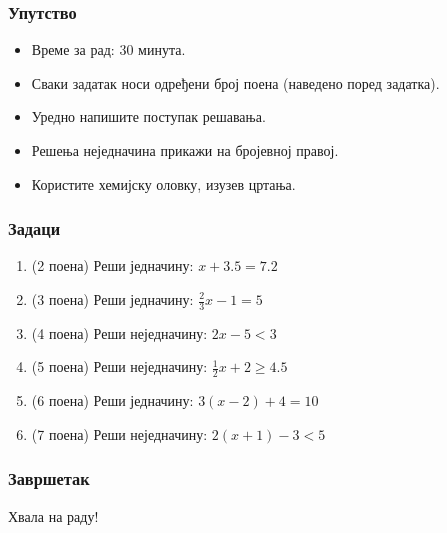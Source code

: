 \documentclass[11pt]{beamer}
\begin{document}
\begin{frame}
    \frametitle{Упут{}ство}
    \begin{itemize}
        \item Време за рад: 30 минута.
        \item Сваки задатак носи одређени број поена (наведено поред задатка).
        \item Уредно напишите поступак решавања.
        \item Решења неједначина прикажи на бројевној правој.
        \item Користите хемијску оловку, изузев цртања.
    \end{itemize}
\end{frame}

\begin{frame}
    \frametitle{Задаци}

    \begin{enumerate}
        \item (2 поена) Реши једначину: $x + 3.5 = 7.2$
        \item (3 поена) Реши једначину: $\frac{2}{3}x - 1 = 5$
        \item (4 поена) Реши неједначину: $2x - 5 < 3$
        \item (5 поена) Реши неједначину: $\frac{1}{2}x + 2 \geqslant 4.5$
        \item (6 поена) Реши једначину: $3(x - 2) + 4 = 10$
        \item (7 поена) Реши неједначину: $2(x + 1) - 3 < 5$
    \end{enumerate}

\end{frame}

\begin{frame}
    \frametitle{Завршетак}
    Хвала на раду!
\end{frame}
\end{document}
